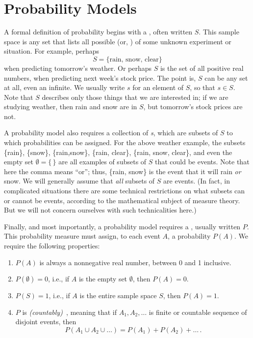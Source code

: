 \section{Probability Models}
A formal definition of probability begins with a , often written  $S$. This
sample space is any set that lists all possible  (or, )
of some unknown experiment or situation. For example, perhaps
\begin{equation*}
    S =  \{\text{rain, snow, clear}\}
\end{equation*}
when predicting tomorrow's weather. Or perhaps $S$ is the set of all positive real numbers, when predicting next
week's stock price. The point is, $S$ can be any set at all, even an infinite. We usually write $s$ for an element of
$S$, so that $s \in S$. Note that $S$ describes only those things that we are interested in; if we are studying
weather, then rain and snow are in $S$, but tomorrow's stock prices are not.

A probability model also requires a collection of \emph{s}, which are subsets of $S$ to which
probabilities can be assigned. For the above weather example, the subsets \{rain\}, \{snow\}, \{rain,snow\}, \{rain,
clear\}, \{rain, snow, clear\}, and even the empty set $\emptyset = \{\,\}$ are all examples of subsets of $S$ that
could be events. Note that here the comma means ``or''; thus, \{rain, snow\} is the event that it will rain \emph{or}
snow. We will generally assume that \emph{all} subsets of $S$ are events. (In fact, in complicated situations there
are some technical restrictions on what subsets can or cannot be events, according to the mathematical subject of
measure theory. But we will not concern ourselves with such technicalities here.)

Finally, and most importantly, a probability model requires a ,
usually written $P$. This probability measure must assign, to each event $A$, a probability $P(A)$. We require the
following properties:
\begin{enumerate}
    \item $P(A)$ is always a nonnegative real number, between 0 and 1 inclusive.
    \item $P(\emptyset) = 0$, i.e., if $A$ is the empty set $\emptyset$, then $P(A)=0$.
    \item $P(S)=1$, i.e., if $A$ is the entire sample space $S$, then $P(A)=1$.
    \item $P$ is \emph{(countably)}~, meaning that if $A_1, A_2, \dots$ is
    finite or countable
    sequence of
    disjoint events, then
    \begin{equation}\label{eq:additive_rule}
        P(A_1 \cup A_2 \cup \ldots) = P(A_1) + P(A_2) + \ldots\,.
    \end{equation}
\end{enumerate}

